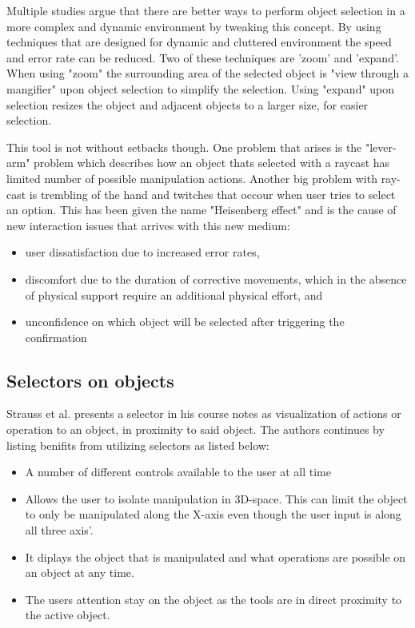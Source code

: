 Multiple studies argue that there are better ways to perform object selection in a more complex and dynamic environment by tweaking this concept\cite{selection:Argelaguet2008,interactions:Bowman1997}. By using techniques that are designed for dynamic and cluttered environment the speed and error rate can be reduced. Two of these techniques are 'zoom' and 'expand'. When using "zoom" the surrounding area of the selected object is "view through a mangifier" upon object selection to simplify the selection. Using "expand" upon selection resizes the object and adjacent objects to a larger size, for easier selection.

This tool is not without setbacks though. One problem that arises is the "lever-arm" problem which describes how an object thats selected with a raycast has limited number of possible manipulation actions\cite{interactions:Poupyrev1996}. Another big problem with ray-cast is trembling of the hand and twitches that occour when user tries to select an option. This has been given the name "Heisenberg effect" and is the cause of new interaction issues that arrives with this new medium\cite{selection:Bowman2001}:

\begin{itemize}
\item user dissatisfaction due to increased error rates,
\item discomfort due to the duration of corrective movements, which in the absence of physical support require an additional physical effort, and
\item unconfidence on which object will be selected after triggering the confirmation
\end{itemize}

\subsection{Selectors on objects}
\label{theory:toolsandtech:selector}
Strauss et al. presents a selector in his course notes\cite{tools:strauss2002design} as visualization of actions or operation to an object, in proximity to said object. The authors continues by listing benifits from utilizing selectors as listed below:
\begin{itemize}
  \item A number of different controls available to the user at all time
  \item Allows the user to isolate manipulation in 3D-space. This can limit the object to only be manipulated along the X-axis even though the user input is along all three axis'.
  \item It diplays the object that is manipulated and what operations are possible on an object at any time.
  \item The users attention stay on the object as the tools are in direct proximity to the active object.
\end{itemize}

